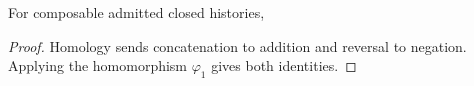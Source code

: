 \setcounter{theorem}{1}
\begin{proposition}
For composable admitted closed histories,

\end{proposition}
\begin{proof}
Homology sends concatenation to addition and reversal to negation. Applying the homomorphism $\varphi_1$ gives both identities.
\end{proof}

